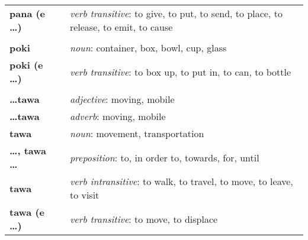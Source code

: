 \begin{supertabular}{p{2,5cm}|ll}
    \textbf{pana (e \dots)}        &  & \textit{verb transitive}: to give, to put, to send, to place, to release, to emit, to cause \\ %
                                   &  &                                                                                             \\ %
    \textbf{poki}                  &  & \textit{noun}: container, box, bowl, cup, glass                                             \\ %
    \textbf{poki (e \dots)}        &  & \textit{verb transitive}: to box up, to put in, to can, to bottle                           \\ %
                                   &  &                                                                                             \\ %
    \textbf{\dots tawa}            &  & \textit{adjective}: moving, mobile                                                          \\ %
    \textbf{\dots tawa}            &  & \textit{adverb}: moving, mobile                                                             \\ %
    \textbf{tawa}                  &  & \textit{noun}: movement, transportation                                                     \\ %
    \textbf{\dots , tawa \dots}    &  & \textit{preposition}: to, in order to, towards, for, until                                  \\ %
    \textbf{tawa}                  &  & \textit{verb intransitive}: to walk, to travel, to move, to leave, to visit                 \\ %
    \textbf{tawa (e \dots)}        &  & \textit{verb transitive}: to move, to displace                                              \\ %
\end{supertabular} \\
%
\newpage{}
%
